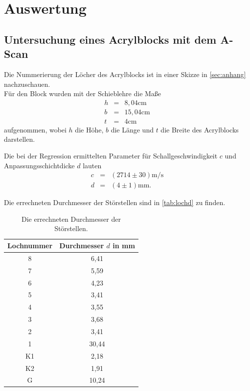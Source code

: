 \section{Auswertung}
\label{sec:Auswertung}

\subsection{Untersuchung eines Acrylblocks mit dem A-Scan}
Die Nummerierung der Löcher des Acrylblocks ist in einer Skizze in \autoref{sec:anhang} nachzuschauen.\\
Für den Block wurden mit der Schieblehre die Maße
\begin{eqnarray}
    h &=& 8,04 \mathrm{cm} \nonumber \\
    b &=& 15,04 \mathrm{cm} \nonumber \\
    t &=& 4 \mathrm{cm} \nonumber 
\end{eqnarray}
aufgenommen, wobei $h$ die Höhe, $b$ die Länge und $t$ die Breite des Acrylblocks darstellen. 

Die bei der Regression ermittelten Parameter für Schallgeschwindigkeit $c$ und Anpassungsschichtdicke $d$ lauten
\begin{eqnarray}
    c &=& (2714 \pm 30) \mathrm{m/s} \nonumber \\
    d &=& (4 \pm 1 )\mathrm{mm.} \nonumber 
\end{eqnarray}

Die errechneten Durchmesser der Störstellen sind in \autoref{tab:lochd} zu finden.\\

\begin{table}[h]
    \centering
    \caption{Die errechneten Durchmesser der Störstellen.}
    \begin{tabular}{cc}
      \toprule
      {Lochnummer} & 
      {Durchmesser $d$ in mm }\\
      \midrule
      8  &  6,41    \\
      7  &  5,59    \\
      6  &  4,23    \\
      5  &  3,41    \\
      4  &  3,55    \\
      3  &  3,68    \\
      2  &  3,41    \\
      1  &  30,44   \\
      K1 &  2,18    \\
      K2 &  1,91    \\   
      G  &  10,24   \\
      \bottomrule
    \end{tabular}
    \label{tab:lochd}
  \end{table}
\noindent


